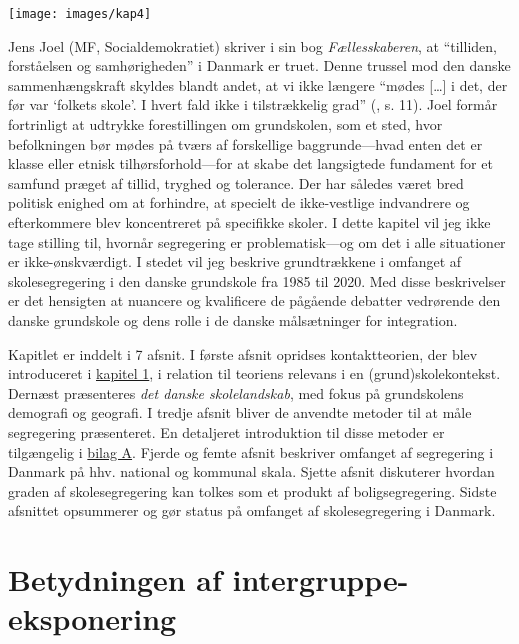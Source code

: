 \documentclass[
]{book}
\begin{document}
\texttt{[image: images/kap4]}

\newpage

Jens Joel (MF, Socialdemokratiet) skriver i sin bog \emph{Fællesskaberen}, at ``tilliden, forståelsen og samhørigheden'' i Danmark er truet. Denne trussel mod den danske sammenhængskraft skyldes blandt andet, at vi ikke længere ``mødes {[}\ldots{]} i det, der før var `folkets skole'. I hvert fald ikke i tilstrækkelig grad'' (, s. 11). Joel formår fortrinligt at udtrykke forestillingen om grundskolen, som et sted, hvor befolkningen bør mødes på tværs af forskellige baggrunde---hvad enten det er klasse eller etnisk tilhørsforhold---for at skabe det langsigtede fundament for et samfund præget af tillid, tryghed og tolerance. Der har således været bred politisk enighed om at forhindre, at specielt de ikke-vestlige indvandrere og efterkommere blev koncentreret på specifikke skoler. I dette kapitel vil jeg ikke tage stilling til, hvornår segregering er problematisk---og om det i alle situationer er ikke-ønskværdigt. I stedet vil jeg beskrive grundtrækkene i omfanget af skolesegregering i den danske grundskole fra 1985 til 2020. Med disse beskrivelser er det hensigten at nuancere og kvalificere de pågående debatter vedrørende den danske grundskole og dens rolle i de danske målsætninger for integration.

Kapitlet er inddelt i 7 afsnit. I første afsnit opridses kontaktteorien, der blev introduceret i \hyperref[kap1]{kapitel 1}, i relation til teoriens relevans i en (grund)skolekontekst. Dernæst præsenteres \emph{det danske skolelandskab}, med fokus på grundskolens demografi og geografi. I tredje afsnit bliver de anvendte metoder til at måle segregering præsenteret. En detaljeret introduktion til disse metoder er tilgængelig i \hyperref[bilag1]{bilag A}. Fjerde og femte afsnit beskriver omfanget af segregering i Danmark på hhv. national og kommunal skala. Sjette afsnit diskuterer hvordan graden af skolesegregering kan tolkes som et produkt af boligsegregering. Sidste afsnittet opsummerer og gør status på omfanget af skolesegregering i Danmark.

\section{Betydningen af intergruppe-eksponering}\label{betydningen-af-intergruppe-eksponering}
\end{document}
